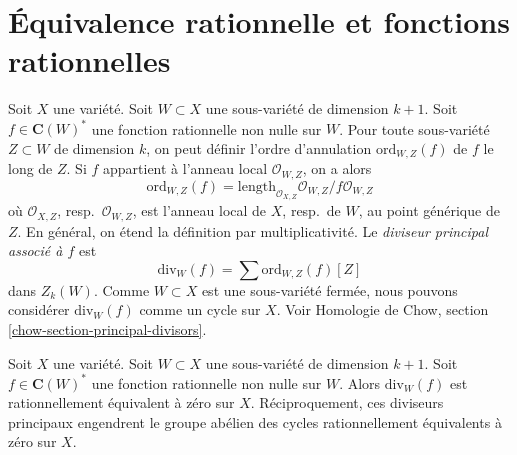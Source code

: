 \section{Équivalence rationnelle et fonctions rationnelles}
\label{section-alternative}

\noindent
Soit $X$ une variété. Soit $W \subset X$ une sous-variété
de dimension $k + 1$. Soit $f \in \mathbf{C}(W)^*$ une fonction rationnelle non nulle
sur $W$. Pour toute sous-variété $Z \subset W$ de dimension $k$,
on peut définir l'ordre d'annulation $\text{ord}_{W, Z}(f)$ de $f$ le long de
$Z$. Si $f$ appartient à l'anneau local $\mathcal{O}_{W, Z}$,
on a alors
$$
\text{ord}_{W, Z}(f) =
\text{length}_{\mathcal{O}_{X, Z}} \mathcal{O}_{W, Z}/f\mathcal{O}_{W, Z}
$$
où $\mathcal{O}_{X, Z}$, resp.\ $\mathcal{O}_{W, Z}$, est l'anneau
local de $X$, resp.\ de $W$, au point générique de $Z$. En général, on
étend la définition par multiplicativité. Le {\it diviseur principal
associé à $f$} est
$$
\text{div}_W(f) = \sum \text{ord}_{W, Z}(f)[Z]
$$
dans $Z_k(W)$. Comme $W \subset X$ est une sous-variété fermée, nous pouvons considérer
$\text{div}_W(f)$ comme un cycle sur $X$.
Voir Homologie de Chow, section \ref{chow-section-principal-divisors}.

\begin{lemma}
\label{lemma-rational-equivalence}
Soit $X$ une variété. Soit $W \subset X$ une sous-variété
de dimension $k + 1$. Soit $f \in \mathbf{C}(W)^*$ une fonction rationnelle non nulle
sur $W$. Alors $\text{div}_W(f)$ est rationnellement équivalent à zéro sur
$X$. Réciproquement, ces diviseurs principaux engendrent le groupe abélien des
cycles rationnellement équivalents à zéro sur $X$.
\end{lemma}

